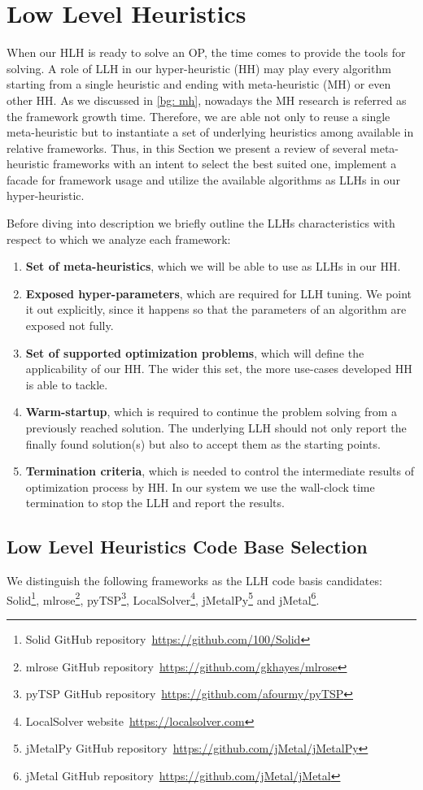 \section{Low Level Heuristics}\label{impl: LLH}
When our HLH is ready to solve an OP, the time comes to provide the tools for solving. A role of LLH in our hyper-heuristic (HH) may play every algorithm starting from a single heuristic and ending with meta-heuristic (MH) or even other HH. As we discussed in \cref{bg: mh}, nowadays the MH research is referred as the framework growth time. Therefore, we are able not only to reuse a single meta-heuristic but to instantiate a set of underlying heuristics among available in relative frameworks. Thus, in this Section we present a review of several meta-heuristic frameworks with an intent to select the best suited one, implement a facade for framework usage and utilize the available algorithms as LLHs in our hyper-heuristic.

Before diving into description we briefly outline the LLHs characteristics with respect to which we analyze each framework:
\begin{enumerate}
	\item \textbf{Set of meta-heuristics}, which we will be able to use as LLHs in our HH.
	
	\item \textbf{Exposed hyper-parameters}, which are required for LLH tuning. We point it out explicitly, since it happens so that the parameters of an algorithm are exposed not fully.
	
	\item \textbf{Set of supported optimization problems}, which will define the applicability of our HH. The wider this set, the more use-cases developed HH is able to tackle.
	
	\item \textbf{Warm-startup}, which is required to continue the problem solving from a previously reached solution. The underlying LLH should not only report the finally found solution(s) but also to accept them as the starting points.
	
	\item \textbf{Termination criteria}, which is needed to control the intermediate results of optimization process by HH. In our system we use the wall-clock time termination to stop the LLH and report the results.
\end{enumerate}


\subsection{Low Level Heuristics Code Base Selection}\label{implementation:llh code basis selection}
We distinguish the following frameworks as the LLH code basis candidates: Solid\footnote{Solid GitHub repository~\url{https://github.com/100/Solid}}, mlrose\footnote{mlrose GitHub repository~\url{https://github.com/gkhayes/mlrose}}, pyTSP\footnote{pyTSP GitHub repository~\url{https://github.com/afourmy/pyTSP}}, LocalSolver\footnote{LocalSolver website~\url{https://localsolver.com}}, jMetalPy\footnote{jMetalPy GitHub repository~\url{https://github.com/jMetal/jMetalPy}} and jMetal\footnote{jMetal GitHub repository~\url{https://github.com/jMetal/jMetal}}.

